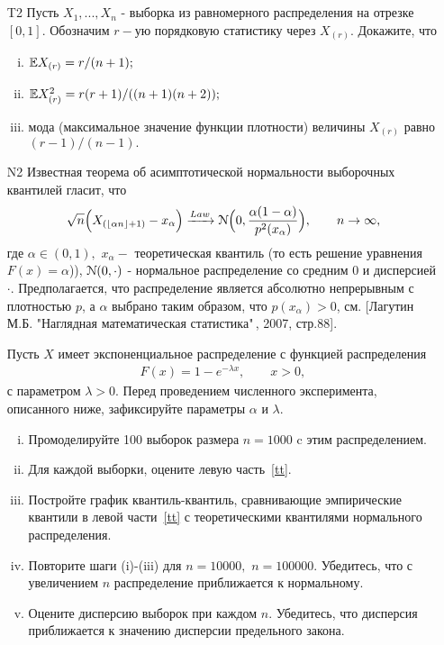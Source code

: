 \documentclass[12pt]{article}
\begin{document}
\section{}
\begin{enumerate}
\item[T2]
Пусть \(X_1, ..., X_n\) - выборка из равномерного распределения на отрезке \([0,1]. \)  Обозначим   \(r-\)ую порядковую статистику через \(X_{(r)}\). Докажите, что 
\begin{enumerate}[(i)]
\item \({\mathbb E} X_{(r)} = r/(n+1);\)
\item \({\mathbb E} X^2_{(r)}=r(r+1)/((n+1)(n+2));\) 
\item мода (максимальное значение функции плотности) величины \(X_{(r)}\) равно \((r-1)/(n-1).\)
\end{enumerate}
\item[N2] Известная теорема об асимптотической нормальности выборочных квантилей гласит, что
\begin{eqnarray}\label{tt}
\sqrt{n} \Bigl( 
X_{(\lfloor \alpha n \rfloor +1)} - x_\alpha \Bigr) \xrightarrow{Law} \EuScript{N}\Bigl(0, \frac{\alpha(1-\alpha)}{p^2(x_\alpha)}\Bigr), \qquad n \to \infty,
\end{eqnarray}
где \(\alpha \in (0,1),\) \(x_\alpha-\) теоретическая квантиль (то есть решение уравнения \(F(x)=\alpha\))), \(\EuScript{N}(0,\cdot)\) - нормальное распределение со средним 0 и дисперсией \(\cdot\). Предполагается, что распределение является абсолютно непрерывным с плотностью \(p\), а \(\alpha\)  выбрано таким образом, что \(p(x_\alpha)>0\), см. [Лагутин М.Б. "Наглядная математическая статистика"\,, 2007, стр.88]. 

Пусть \(X\) имеет экспоненциальное распределение с функцией распределения
\begin{eqnarray*}
F(x) = 1 -  e^{-\lambda x}, \qquad x>0,
\end{eqnarray*}
с параметром \(\lambda>0.\)  Перед проведением численного эксперимента, описанного ниже, зафиксируйте параметры \(\alpha\) и \(\lambda.\)
\begin{enumerate}[(i)]
\item  Промоделируйте 100 выборок размера \(n=1000\) c этим распределением. 
\item Для каждой выборки, оцените левую часть~\eqref{tt}. 
\item Постройте график квантиль-квантиль, сравнивающие  эмпирические квантили в левой части~\eqref{tt} с теоретическими квантилями нормального распределения. 
\item Повторите шаги (i)-(iii) для \(n=10000, \) \(n=100000\). Убедитесь, что с увеличением \(n\) распределение приближается к нормальному. 
\item  Оцените дисперсию  выборок при каждом \(n\). Убедитесь, что дисперсия приближается к значению дисперсии предельного закона. 
\end{enumerate}

\end{enumerate}
\end{document}
